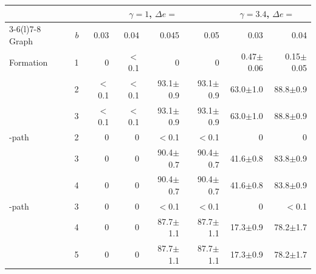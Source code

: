 \begin{tabular}{@{}lrrrrrrr@{}}
\toprule
 & & \multicolumn{4}{c}{$\gamma=1$, $\Delta e=$} & \multicolumn{2}{c}{$\gamma=3.4$, $\Delta e=$}\\
\cmidrule(lr){3-6}\cmidrule(l){7-8}
Graph & $b$ & 0.03 & 0.04 & 0.045 & 0.05 & 0.03 & 0.04\\
\midrule
Formation & 1 & 0 & $<$0.1 & 0 & 0 & 0.47$\pm$0.06 & 0.15$\pm$0.05\\
 & 2 & $<$0.1 & $<$0.1 & 93.1$\pm$0.9 & 93.1$\pm$0.9 & 63.0$\pm$1.0 & 88.8$\pm$0.9\\
 & 3 & $<$0.1 & $<$0.1 & 93.1$\pm$0.9 & 93.1$\pm$0.9 & 63.0$\pm$1.0 & 88.8$\pm$0.9\\
\addlinespace[1pt]
3-path & 2 & 0 & 0 & $<$0.1 & $<$0.1 & 0 & 0\\
 & 3 & 0 & 0 & 90.4$\pm$0.7 & 90.4$\pm$0.7 & 41.6$\pm$0.8 & 83.8$\pm$0.9\\
 & 4 & 0 & 0 & 90.4$\pm$0.7 & 90.4$\pm$0.7 & 41.6$\pm$0.8 & 83.8$\pm$0.9\\
\addlinespace[1pt]
4-path & 3 & 0 & 0 & $<$0.1 & $<$0.1 & 0 & $<$0.1\\
 & 4 & 0 & 0 & 87.7$\pm$1.1 & 87.7$\pm$1.1 & 17.3$\pm$0.9 & 78.2$\pm$1.7\\
 & 5 & 0 & 0 & 87.7$\pm$1.1 & 87.7$\pm$1.1 & 17.3$\pm$0.9 & 78.2$\pm$1.7\\
\bottomrule
\end{tabular}

